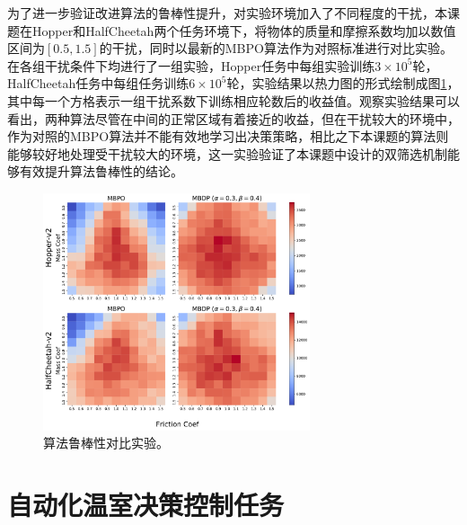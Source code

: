 为了进一步验证改进算法的鲁棒性提升，对实验环境加入了不同程度的干扰，本课题在Hopper和HalfCheetah两个任务环境下，将物体的质量和摩擦系数均加以数值区间为$[0.5,1.5]$的干扰，同时以最新的MBPO算法作为对照标准进行对比实验。在各组干扰条件下均进行了一组实验，Hopper任务中每组实验训练$3\times 10^5$轮，HalfCheetah任务中每组任务训练$6\times 10^5$轮，实验结果以热力图的形式绘制成图\ref{fig:robustness-heatmap}，其中每一个方格表示一组干扰系数下训练相应轮数后的收益值。观察实验结果可以看出，两种算法尽管在中间的正常区域有着接近的收益，但在干扰较大的环境中，作为对照的MBPO算法并不能有效地学习出决策策略，相比之下本课题的算法则能够较好地处理受干扰较大的环境，这一实验验证了本课题中设计的双筛选机制能够有效提升算法鲁棒性的结论。

\begin{figure}
  \centering
  \includegraphics[width=0.7\textwidth]{figures/robustness-heatmap.pdf}
  \caption{算法鲁棒性对比实验。}
  \label{fig:robustness-heatmap}
\end{figure}

\section{自动化温室决策控制任务}
